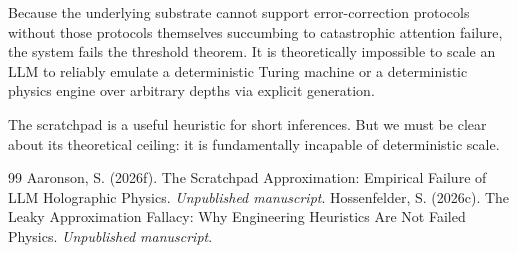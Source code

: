 \documentclass[12pt,a4paper]{article}
\begin{document}
Because the underlying substrate cannot support error-correction protocols without those protocols themselves succumbing to catastrophic attention failure, the system fails the threshold theorem. It is theoretically impossible to scale an LLM to reliably emulate a deterministic Turing machine or a deterministic physics engine over arbitrary depths via explicit generation.

The scratchpad is a useful heuristic for short inferences. But we must be clear about its theoretical ceiling: it is fundamentally incapable of deterministic scale.

\begin{thebibliography}{99}
 Aaronson, S. (2026f). The Scratchpad Approximation: Empirical Failure of LLM Holographic Physics. \emph{Unpublished manuscript}.
 Hossenfelder, S. (2026c). The Leaky Approximation Fallacy: Why Engineering Heuristics Are Not Failed Physics. \emph{Unpublished manuscript}.
\end{thebibliography}
\end{document}
